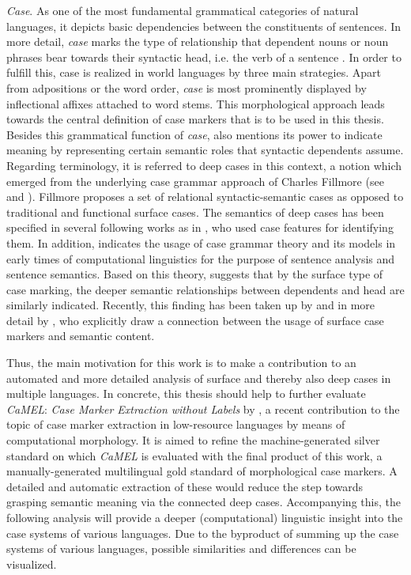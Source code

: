 \documentclass[11pt,a4paper,twoside,openright]{scrbook}
\begin{document}
\textit{Case}. As one of the most fundamental grammatical categories of natural languages, it depicts basic dependencies between the constituents of sentences. In more detail, \textit{case} marks the type of relationship that dependent nouns or noun phrases bear towards their syntactic head, i.e. the verb of a sentence \citep{blake1994case}. In order to fulfill this, case is realized in world languages by three main strategies. Apart from adpositions or the word order, \textit{case} is most prominently displayed by inflectional affixes attached to word stems. This morphological approach leads towards the central definition of case markers that is to be used in this thesis. Besides this grammatical function of \textit{case}, \citet{blake1994case} also mentions its power to indicate meaning by representing certain semantic roles that syntactic dependents assume. Regarding terminology, it is referred to deep cases in this context, a notion which emerged from the underlying case grammar approach of Charles Fillmore (see \citet{fillmore1987case} and \citet{cook1989case}). Fillmore proposes a set of relational syntactic-semantic cases as opposed to traditional and functional surface cases. The semantics of deep cases has been specified in several following works as in \citet{nilsen1972deep}, who used case features for identifying them. In addition, \citet{cook1989case} indicates the usage of case grammar theory and its models in early times of computational linguistics for the purpose of sentence analysis and sentence semantics. Based on this theory, \citet{butt2006case} suggests that by the surface type of case marking, the deeper semantic relationships between dependents and head are similarly indicated. Recently, this finding has been taken up by \citet{grimm2011semcas} and in more detail by \citet{cysouw2014cas}, who explicitly draw a connection between the usage of surface case markers and semantic content. 

Thus, the main motivation for this work is to make a contribution to an automated and more detailed analysis of surface and thereby also deep cases in multiple languages. In concrete, this thesis should help to further evaluate \textit{CaMEL}: \textit{Case Marker Extraction without Labels} by \citet{weissweiler2022camel}, a recent contribution to the topic of case marker extraction in low-resource languages by means of computational morphology. It is aimed to refine the machine-generated silver standard on which \textit{CaMEL} is evaluated with the final product of this work, a manually-generated multilingual gold standard of morphological case markers. A detailed and automatic extraction of these would reduce the step towards grasping semantic meaning via the connected deep cases. Accompanying this, the following analysis will provide a deeper (computational) linguistic insight into the case systems of various languages. Due to the byproduct of summing up the case systems of various languages, possible similarities and differences can be visualized.
\end{document}
